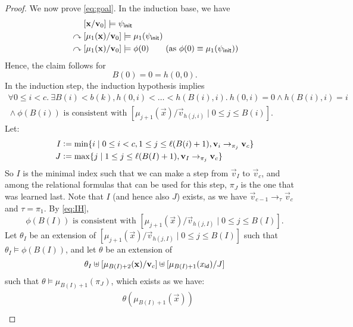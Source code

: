 {\begin{proof}
    We now prove \eqref{eq:goal}. 
    In the induction base, we have
    \begin{align*}
                             & [\vec{x}/\vec{v}_0] \models \psi_\init                                                     \\
      {} \curvearrowright {} & [\mu_{1}(\vec{x})/\vec{v}_0] \models \mu_{1}(\psi_\init)                                   \\
      {} \curvearrowright {} & [\mu_{1}(\vec{x})/\vec{v}_0] \models \phi(0) \tag{as $\phi(0) \equiv \mu_{1}(\psi_\init)$}
    \end{align*}
    Hence, the claim follows for
    \[
      B(0) = 0 = h(0,0).
    \]
    In the induction step, the induction hypothesis implies
    \begin{multline}
      \label{eq:IH}
      \forall 0 \leq i < c.\ \exists B(i) < b(k), h(0,i) < \ldots < h(B(i),i).\ h(0,i) = 0 \land h(B(i),i) = i\\
      {} \land \phi(B(i)) \text{ is consistent with } [\mu_{j+1}(\vec{x})/\vec{v}_{h(j,i)} \mid 0 \leq j \leq B(i)].
    \end{multline}
    Let:
    \begin{align*}
      I & {} \mathrel{\mathop:}= \min \{i \mid 0 \leq i < c, 1 \leq j \leq \ell(B(i)+1), \bm{\mathrm{v}}_i \to_{\pi_j} \bm{\mathrm{v}}_c\} \\
      J & {} \mathrel{\mathop:}= \max \{j \mid 1 \leq j \leq \ell(B(I)+1), \bm{\mathrm{v}}_I \to_{\pi_j} \bm{\mathrm{v}}_c\}
    \end{align*}
    So $I$ is the minimal index such that we can make a step from $\vec{v}_I$ to $\vec{v}_c$, and among the relational formulas that can be used for this step, $\pi_J$ is the one that was learned last.
    Note that $I$ (and hence also $J$) exists, as we have $\vec{v}_{c-1} \to_{\tau} \vec{v}_c$ and $\tau = \pi_1$.
    By \eqref{eq:IH},
    \[
      \phi(B(I)) \text{ is consistent with } [\mu_{j+1}(\vec{x})/\vec{v}_{h(j,I)} \mid 0 \leq j \leq B(I)].
    \]
    Let $\theta_I$ be an extension of $[\mu_{j+1}(\vec{x})/\vec{v}_{h(j,I)} \mid 0 \leq j \leq B(I)]$ such that $\theta_I \models \phi(B(I))$, and let $\theta$ be an extension of
    \begin{equation}
      \label{eq:theta}
      \theta_I \uplus [\mu_{B(I)+2}(\bm{\mathrm{x}})/\bm{\mathrm{v}}_c] \uplus [\mu_{B(I)+1}(x_{\mathsf{id}}) / J]
    \end{equation}
    such that $\theta \models \mu_{B(I)+1}(\pi_J)$, which exists as we have:
    \begin{align*}
      & \theta(\mu_{B(I)+1}(\vec{x})) \\

\end{align*}
\end{proof}}
